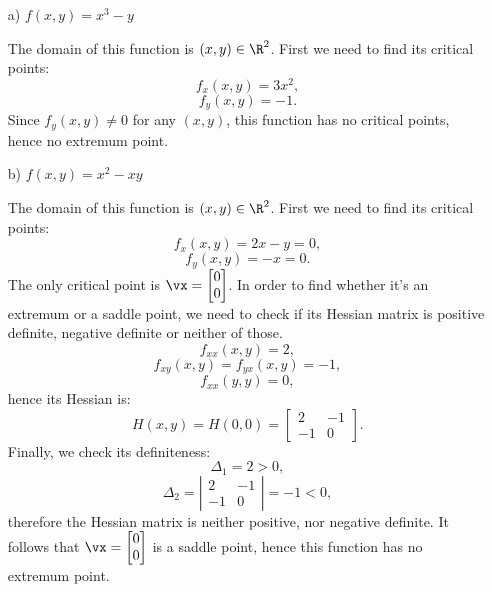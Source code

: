 \begin{solution}
\begin{enumerate}
        \item[a) ] $f(x,y)=x^3-y$
        
        The domain of this function is $(x,y)\in\R^2$. First we need to find its critical points:
\[ f_x(x,y)=3x^2, \]
\[ f_y(x,y)=-1. \]
Since $f_y(x,y)\ne 0$ for any $(x,y)$, this function has no critical points, hence no extremum point.

        
        \item[b) ] $f(x,y)=x^2-xy$
        
    The domain of this function is $(x,y)\in\R^2$. First we need to find its critical points:
\[ f_x(x,y)=2x-y=0,\]
\[ f_y(x,y)=-x=0. \]
The only critical point is $\vx = \begin{bmatrix}
    0 \\ 0
\end{bmatrix}$. In order to find whether it's an extremum or a saddle point, we need to check if its Hessian matrix is positive definite, negative definite or neither of those.
\[  f_{xx}(x,y) = 2,  \]
\[  f_{xy}(x,y)=f_{yx}(x,y) = -1,  \]
\[  f_{xx}(y,y) = 0,  \]
hence its Hessian is:
\[ H(x,y) = H(0,0) = \begin{bmatrix}2&-1\\-1&0\end{bmatrix}. \]
Finally, we check its definiteness:
\[ \Delta_1 = 2 > 0, \]
\[ \Delta_2 = \left|\begin{array}{cc}
    2 & -1 \\
    -1 & 0
\end{array}\right| =-1< 0, \]
therefore the Hessian matrix is neither positive, nor negative definite. It follows that $\vx=\begin{bmatrix}
    0\\0
\end{bmatrix}$ is a saddle point, hence this function has no extremum point.

        
\end{enumerate}
\end{solution}
\smallskip

